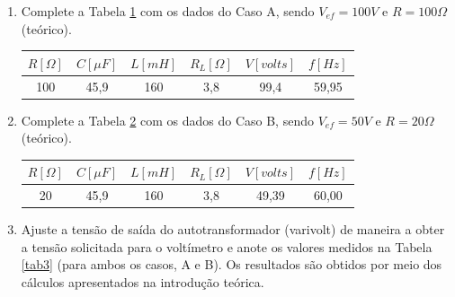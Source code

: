 \documentclass[a4paper,12pt,oneside,openany,table,xcdraw]{article}
\begin{document}
\begin{enumerate}[1 - ]
\item Complete a Tabela \ref{tab1} com os dados do Caso A, sendo $V_{ef}=100V$ e $R=100\Omega$ (teórico).

\begin{table}[h]
\centering
\def\arraystretch{1.35}
\captionsetup{font=scriptsize}
 \label{tab1}
\begin{tabular}{|c|c|c|c|c|c|}
\hline
$R [\Omega]$ & $C [\mu F]$ & $L [mH]$ & $R_L [\Omega]$ & $V [volts]$ & $f [Hz]$ \\ \hline
       100      &    45,9     &    160      &         3,8       &      99,4       &     59,95     \\ \hline
\end{tabular}
\end{table}

\item Complete a Tabela \ref{tab2} com os dados do Caso B, sendo $V_{ef}=50V$ e $R=20\Omega$ (teórico). \\

\begin{table}[h]
\centering
\def\arraystretch{1.35}
\captionsetup{font=scriptsize}
 \label{tab2}
\begin{tabular}{|c|c|c|c|c|c|}
\hline
$R [\Omega]$ & $C [\mu F]$ & $L [mH]$ & $R_L [\Omega]$ & $V [volts]$ & $f [Hz]$ \\ \hline
       20      &    45,9     &    160      &         3,8       &       49,39      &     60,00     \\ \hline
\end{tabular}
\end{table}

\item Ajuste a tensão de saída do autotransformador (varivolt) de maneira a obter a tensão solicitada para o voltímetro e anote os valores medidos na Tabela \ref{tab3} (para ambos os casos, A e B). Os resultados são obtidos por meio dos cálculos apresentados na introdução teórica. \\
\begin{table}[H]
\centering
\def\arraystretch{1.35}
\captionsetup{font=scriptsize}
 \label{tab3}


\end{table}
\end{enumerate}
\end{document}
